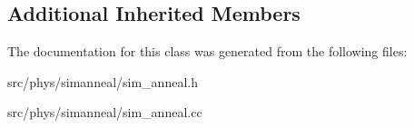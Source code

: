 \subsection*{Additional Inherited Members}


The documentation for this class was generated from the following files\+:\begin{DoxyCompactItemize}
\item 
src/phys/simanneal/sim\+\_\+anneal.\+h\item 
src/phys/simanneal/sim\+\_\+anneal.\+cc\end{DoxyCompactItemize}
